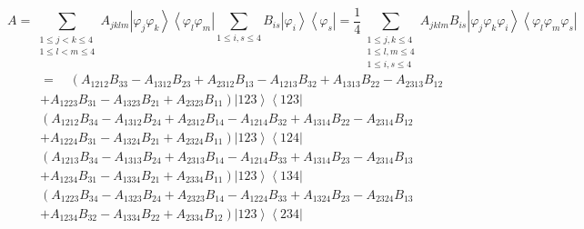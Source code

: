 \documentclass[aps,preprint]{revtex4}%
\begin{document}
\begin{equation}
A=\sum_{\substack{1\leq j<k\leq4\\1\leq l<m\leq4}}A_{jklm}\left\vert
\varphi_{j}\varphi_{k}\right\rangle \left\langle \varphi_{l}\varphi
_{m}\right\vert \sum_{1\leq i,s\leq4}B_{is}\left\vert \varphi_{i}\right\rangle
\left\langle \varphi_{s}\right\vert =\frac{1}{4}\sum_{\substack{1\leq
j,k\leq4\\1\leq l,m\leq4\\1\leq i,s\leq4}}A_{jklm}B_{is}\left\vert \varphi
_{j}\varphi_{k}\varphi_{i}\right\rangle \left\langle \varphi_{l}\varphi
_{m}\varphi_{s}\right\vert
\end{equation}%
\begin{align}
&  =\quad\left(  A_{1212}B_{33}-A_{1312}B_{23}+A_{2312}B_{13}-A_{1213}%
B_{32}+A_{1313}B_{22}-A_{2313}B_{12}\right.  \nonumber\\
&  \left.  +A_{1223}B_{31}-A_{1323}B_{21}+A_{2323}B_{11}\right)  \left\vert
123\right\rangle \left\langle 123\right\vert \nonumber\\
&  \left(  A_{1212}B_{34}-A_{1312}B_{24}+A_{2312}B_{14}-A_{1214}%
B_{32}+A_{1314}B_{22}-A_{2314}B_{12}\right.  \nonumber\\
&  \left.  +A_{1224}B_{31}-A_{1324}B_{21}+A_{2324}B_{11}\right)  \left\vert
123\right\rangle \left\langle 124\right\vert \nonumber\\
&  \left(  A_{1213}B_{34}-A_{1313}B_{24}+A_{2313}B_{14}-A_{1214}%
B_{33}+A_{1314}B_{23}-A_{2314}B_{13}\right.  \nonumber\\
&  \left.  +A_{1234}B_{31}-A_{1334}B_{21}+A_{2334}B_{11}\right)  \left\vert
123\right\rangle \left\langle 134\right\vert \nonumber\\
&  \left(  A_{1223}B_{34}-A_{1323}B_{24}+A_{2323}B_{14}-A_{1224}%
B_{33}+A_{1324}B_{23}-A_{2324}B_{13}\right.  \nonumber\\
&  \left.  +A_{1234}B_{32}-A_{1334}B_{22}+A_{2334}B_{12}\right)  \left\vert
123\right\rangle \left\langle 234\right\vert
\end{align}%
\end{document}
